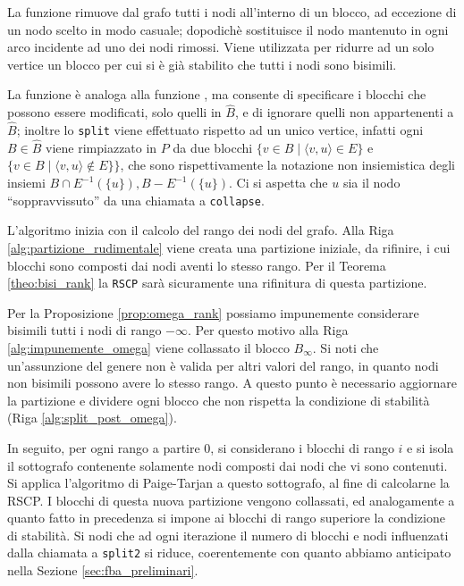 La funzione  rimuove dal grafo tutti i nodi all'interno di un blocco, ad eccezione di un nodo scelto in modo casuale; dopodichè sostituisce il nodo mantenuto in ogni arco incidente ad uno dei nodi rimossi. Viene utilizzata per ridurre ad un solo vertice un blocco per cui si è già stabilito che tutti i nodi sono bisimili.

La funzione  è analoga alla funzione , ma consente di specificare i blocchi che possono essere modificati, solo quelli in $\widehat{B}$, e di ignorare quelli non appartenenti a $\widehat{B}$; inoltre lo \texttt{split} viene effettuato rispetto ad un unico vertice, infatti ogni $B \in \widehat{B}$ viene rimpiazzato in $P$ da due blocchi $\{v \in B \mid \langle v, u\rangle \in E\}$ e $\{v \in B \mid \langle v, u \rangle \not\in E\}\}$, che sono rispettivamente la notazione non insiemistica degli insiemi $B \cap E^{-1}(\{u\}), B - E^{-1}(\{u\})$. Ci si aspetta che $u$ sia il nodo ``soppravvissuto'' da una chiamata a \texttt{collapse}.

L'algoritmo inizia con il calcolo del rango dei nodi del grafo. Alla Riga \ref{alg:partizione_rudimentale} viene creata una partizione iniziale, da rifinire, i cui blocchi sono composti dai nodi aventi lo stesso rango. Per il Teorema \ref{theo:bisi_rank} la \texttt{RSCP} sarà sicuramente una rifinitura di questa partizione.

Per la Proposizione \ref{prop:omega_rank} possiamo impunemente considerare bisimili tutti i nodi di rango $-\infty$. Per questo motivo alla Riga \ref{alg:impunemente_omega} viene collassato il blocco $B_\infty$. Si noti che un'assunzione del genere non è valida per altri valori del rango, in quanto nodi non bisimili possono avere lo stesso rango. A questo punto è necessario aggiornare la partizione e dividere ogni blocco che non rispetta la condizione di stabilità (Riga \ref{alg:split_post_omega}).

In seguito, per ogni rango a partire 0, si considerano i blocchi di rango $i$ e si isola il sottografo contenente solamente nodi composti dai nodi che vi sono contenuti. Si applica l'algoritmo di Paige-Tarjan a questo sottografo, al fine di calcolarne la RSCP. I blocchi di questa nuova partizione vengono collassati, ed analogamente a quanto fatto in precedenza si impone ai blocchi di rango superiore la condizione di stabilità. Si nodi che ad ogni iterazione il numero di blocchi e nodi influenzati dalla chiamata a \texttt{split2} si riduce, coerentemente con quanto abbiamo anticipato nella Sezione \ref{sec:fba_preliminari}.

